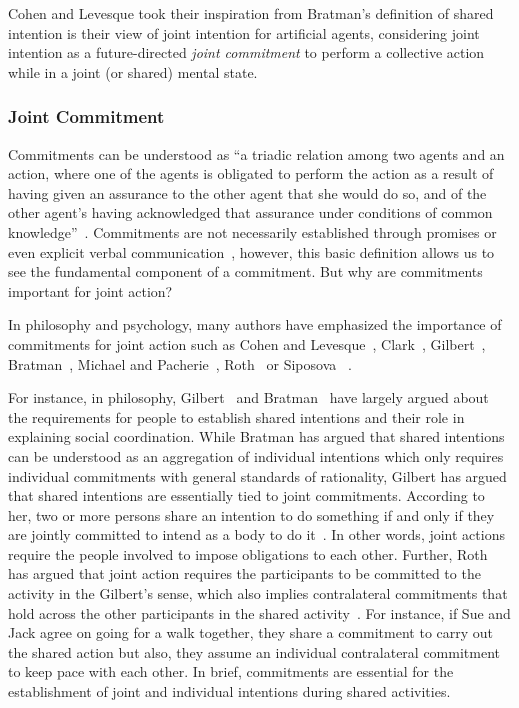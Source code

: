 \documentclass[a4paper,11pt,twoside]{StyleThese}
\begin{document}
Cohen and Levesque took their inspiration from Bratman's definition of shared intention is their view of joint intention for artificial agents, considering joint intention as a future-directed \textit{joint commitment} to perform a collective action while in a joint (or shared) mental state.

\subsubsection{Joint Commitment}
Commitments can be understood as ``a triadic relation among two agents and an action, where one of the agents is obligated to perform the action as a result of having given an assurance to the other agent that she would do so, and of the other agent’s having acknowledged that assurance under conditions of common knowledge''~\cite[p.~756]{michael_2017_commitment}. Commitments are not necessarily established through promises or even explicit verbal communication~\cite{ledyard_1994_public, scanlon_2000_we, siposova_2018_communicative}, however, this basic definition allows us to see the fundamental component of a commitment. But why are commitments important for joint action?

In philosophy and psychology, many authors have emphasized the importance of commitments for joint action such as Cohen and Levesque~\cite{cohen_1991_teamwork}, Clark~\cite{clark_2006_social}, Gilbert~\cite{gilbert_2009_shared}, Bratman~\cite{bratman_2014_shared}, Michael and Pacherie~\cite{michael_2015_commitments}, Roth~\cite{roth_2014_shared} or Siposova \etal~\cite{siposova_2018_communicative}. 

For instance, in philosophy, Gilbert~\cite{gilbert_2009_shared} and Bratman~\cite{bratman_2014_shared} have largely argued about the requirements for people to establish shared intentions and their role in explaining social coordination. While Bratman has argued that shared intentions can be understood as an aggregation of individual intentions which only requires individual commitments with general standards of rationality, Gilbert has argued that shared intentions are essentially tied to joint commitments. According to her, two or more persons share an intention to do something if and only if they are jointly committed to intend as a body to do it~\cite{gilbert_2009_shared}. In other words, joint actions require the people involved to impose obligations to each other. Further, Roth has argued that joint action requires the participants to be committed to the activity in the Gilbert’s sense, which also implies contralateral commitments that hold across the other participants in the shared activity~\cite{roth_2014_shared}. For instance, if Sue and Jack agree on going for a walk together, they share a commitment to carry out the shared action but also, they assume an individual contralateral commitment to keep pace with each other. In brief, commitments are essential for the establishment of joint and individual intentions during shared activities. 
\end{document}
